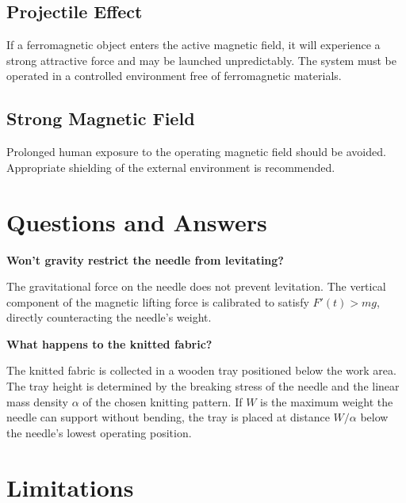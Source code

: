 \documentclass[12pt, a4paper]{article}
\begin{document}
\subsection{Projectile Effect}
If a ferromagnetic object enters the active magnetic field, it will
experience a strong attractive force and may be launched unpredictably.
The system must be operated in a controlled environment free of
ferromagnetic materials.

\subsection{Strong Magnetic Field}
Prolonged human exposure to the operating magnetic field should be
avoided. Appropriate shielding of the external environment is recommended.

\section{Questions and Answers}

\textbf{Won't gravity restrict the needle from levitating?}

The gravitational force on the needle does not prevent levitation. The
vertical component of the magnetic lifting force is calibrated to
satisfy $F'(t) > mg$, directly counteracting the needle's weight.

\textbf{What happens to the knitted fabric?}

The knitted fabric is collected in a wooden tray positioned below the
work area. The tray height is determined by the breaking stress of the
needle and the linear mass density $\alpha$ of the chosen knitting
pattern. If $W$ is the maximum weight the needle can support without
bending, the tray is placed at distance $W / \alpha$ below the needle's
lowest operating position.

\section{Limitations}
\end{document}
